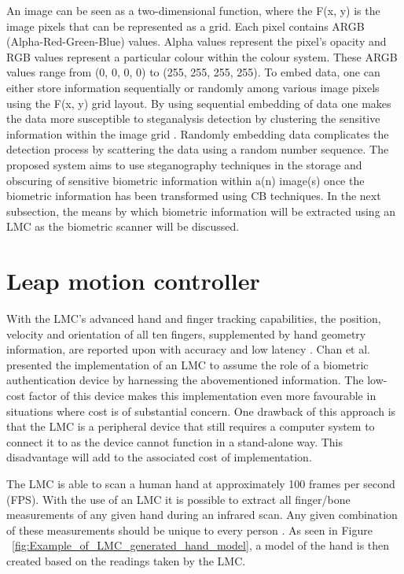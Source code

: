An image can be seen as a two-dimensional function, where the F(x, y) is the image pixels that can be represented as a grid. Each pixel contains ARGB (Alpha-Red-Green-Blue) values. Alpha values represent the pixel’s opacity and RGB values represent a particular colour within the colour system. These ARGB values range from (0, 0, 0, 0) to (255, 255, 255, 255). To embed data, one can either store information sequentially or randomly among various image pixels using the F(x, y) grid layout. By using sequential embedding of data one makes the data more susceptible to steganalysis detection by clustering the sensitive information within the image grid \cite{Laskar2013}. Randomly embedding data complicates the detection process by scattering the data using a random number sequence. The proposed system aims to use steganography techniques in the storage and obscuring of sensitive biometric information within a(n) image(s) once the biometric information has been transformed using CB techniques. In the next subsection, the means by which biometric information will be extracted using an LMC as the biometric scanner will be discussed.


\section[Leap motion controller ]{Leap motion controller }

With the LMC’s advanced hand and finger tracking capabilities, the position, velocity and orientation of all ten fingers, supplemented by hand geometry information, are reported upon with accuracy and low latency \cite{SyedAhmad2012}. Chan et al. \cite{Chan2015}  presented the implementation of an LMC to assume the role of a biometric authentication device by harnessing the abovementioned information. The low-cost factor of this device makes this implementation even more favourable in situations where cost is of substantial concern. One drawback of this approach is that the LMC is a peripheral device that still requires a computer system to connect it to as the device cannot function in a stand-alone way. This disadvantage will add to the associated cost of implementation.

The LMC is able to scan a human hand at approximately 100 frames per second (FPS). With the use of an LMC it is possible to extract all finger/bone measurements of any given hand during an infrared scan. Any given combination of these measurements should be unique to every person \cite{Chan2015}. As seen in Figure ~\ref{fig:Example_of_LMC_generated_hand_model}, a model of the hand is then created based on the readings taken by the LMC.

